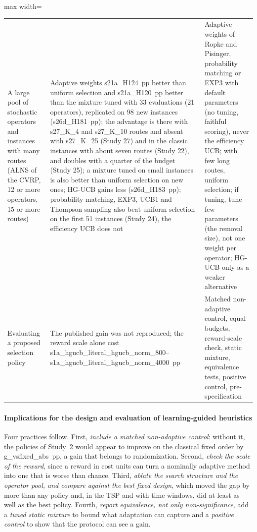 \begin{table}[t]
\begin{adjustbox}{max width=\linewidth}
\begin{tabular}{>{\raggedright\arraybackslash}p{4.2cm}>{\raggedright\arraybackslash}p{5.2cm}>{\raggedright\arraybackslash}p{5.9cm}}
A large pool of stochastic operators and instances with many routes (ALNS of the CVRP, 12 or more operators, 15 or more routes) & Adaptive weights \num{s21a_H124}~pp better than uniform selection and \num{s21a_H120}~pp better than the mixture tuned with 33 evaluations (21 operators), replicated on 98 new instances (\num{s26d_H181}~pp); the advantage is there with \num{s27_K_4} and \num{s27_K_10} routes and absent with \num{s27_K_25} (Study 27) and in the classic instances with about seven routes (Study 22), and doubles with a quarter of the budget (Study 25); a mixture tuned on small instances is also better than uniform selection on new ones; HG-UCB gains less (\num{s26d_H183}~pp); probability matching, EXP3, UCB1 and Thompson sampling also beat uniform selection on the first 51 instances (Study 24), the efficiency UCB does not & Adaptive weights of Ropke and Pisinger, probability matching or EXP3 with default parameters (no tuning, faithful scoring), never the efficiency UCB; with few long routes, uniform selection; if tuning, tune few parameters (the removal size), not one weight per operator; HG-UCB only as a weaker alternative \\
Evaluating a proposed selection policy & The published gain was not reproduced; the reward scale alone cost \num{s1a_hgucb_literal_hgucb_norm_800}--\num{s1a_hgucb_literal_hgucb_norm_4000}~pp & Matched non-adaptive control, equal budgets, reward-scale check, static mixture, equivalence tests, positive control, pre-specification \\
\bottomrule
\end{tabular}
\end{adjustbox}
\end{table}

\paragraph{Implications for the design and evaluation of learning-guided heuristics}
Four practices follow. First, \emph{include a matched non-adaptive control}: without it, the policies of Study~2 would appear to improve on the classical fixed order by \num{g_vsfixed_abs}~pp, a gain that belongs to randomization. Second, \emph{check the scale of the reward}, since a reward in cost units can turn a nominally adaptive method into one that is worse than chance. Third, \emph{ablate the search structure and the operator pool, and compare against the best fixed design}, which moved the gap by more than any policy and, in the TSP and with time windows, did at least as well as the best policy. Fourth, \emph{report equivalence, not only non-significance}, add a \emph{tuned static mixture} to bound what adaptation can capture and a \emph{positive control} to show that the protocol can see a gain.

